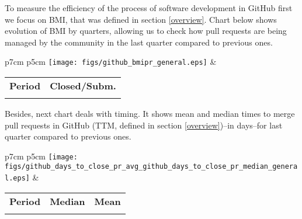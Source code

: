 To measure the efficiency of the process of software development in GitHub first we focus on BMI, that was defined in section \ref{overview}. Chart below shows evolution of BMI by quarters, allowing us to check how pull requests are being managed by the community in the last quarter compared to previous ones.

\begin{tabular}{p{7cm} p{5cm}}
	\vspace{0pt} 
	\texttt{[image: figs/github\_bmipr\_general.eps]}
	& 
	\vspace{0pt}
	\begin{tabular}{l|l}%
		\bfseries Period & \bfseries Closed/Subm. %
		\csvreader[head to column names]{data/github_bmipr_general.csv}{}%
		{\\ & \bmipr}
	\end{tabular}
\end{tabular}

Besides, next chart deals with timing. It shows mean and median times to merge pull requests in GitHub (TTM, defined in section \ref{overview})--in days--for last quarter compared to previous ones.


\begin{tabular}{p{7cm} p{5cm}}
	\vspace{0pt} 
	\texttt{[image: figs/github\_days\_to\_close\_pr\_avg\_github\_days\_to\_close\_pr\_median\_general.eps]}
	& 
	\vspace{0pt}
	\begin{tabular}{l|r|r|}%
		\bfseries Period & \bfseries Median & \bfseries Mean %
		\csvreader[head to column names]{data/github_days_to_close_pr_avg_github_days_to_close_pr_median_general.csv}{}%
		{\\ & \daystocloseprmedian & \daystoclosepravg}
	\end{tabular}
\end{tabular}
